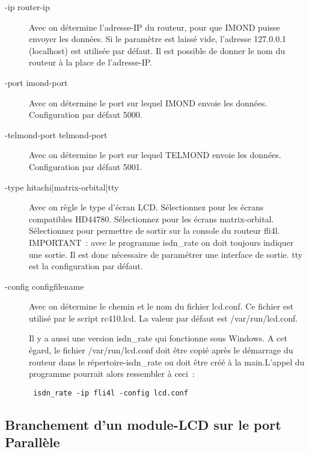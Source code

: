 \begin{description}
\item[-ip router-ip]
        Avec  on détermine l'adresse-IP du routeur, pour que IMOND puisse
        envoyer les données. Si le paramètre est laissé vide, l'adresse 127.0.0.1
        (localhost) est utilisée par défaut. Il est possible de donner le nom du
        routeur à la place de l'adresse-IP.

\item[-port imond-port]
        Avec  on détermine le port sur lequel IMOND envoie les données. 
        Configuration par défaut 5000.

\item[-telmond-port telmond-port]
        Avec  on détermine le port sur lequel TELMOND envoie 
        les données. Configuration par défaut 5001.

\item[-type hitachi|matrix-orbital|tty]
        Avec  on règle le type d'écran LCD.
        Sélectionnez  pour les écrans compatibles HD44780.
        Sélectionnez  pour les écrans matrix-orbital.
        Sélectionnez  pour permettre de sortir sur la console du routeur fli4l.
        IMPORTANT~: avec le programme isdn\_rate on doit toujours indiquer une sortie.
        Il est donc nécessaire de paramétrer une interface de sortie. tty est la
        configuration par défaut.

\item[-config configfilename]
        Avec  on détermine le chemin et le nom du fichier lcd.conf.
        Ce fichier est utilisé par le script rc410.lcd. La valeur par défaut
        est /var/run/lcd.conf.

Il y a aussi une version isdn\_rate qui fonctionne sous Windows. A cet égard,
le fichier /var/run/lcd.conf doit être copié après le démarrage du routeur dans
le répertoire-isdn\_rate ou doit être créé à la main.L'appel du programme pourrait
alors ressembler à ceci~:

\begin{example}
\begin{verbatim}
 isdn_rate -ip fli4l -config lcd.conf
\end{verbatim}
\end{example}
               
\end{description}

\subsection{Branchement d'un module-LCD sur le port Parallèle}
 
